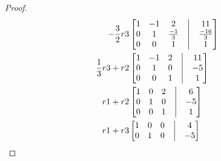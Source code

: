 \documentclass[12pt]{article}
\begin{document}
\begin{enumerate}
\begin{enumerate}
\begin{proof}
                                    \begin{align*}
                                            -\frac{3}{2}r3
                                             &
                                            \begin{bmatrix}
                                                    1 & -1 & 2            & \bigm| & 11            \\
                                                    0 & 1  & \frac{-1}{3} & \bigm| & \frac{-16}{3} \\
                                                    0 & 0  & 1            & \bigm| & 1             \\
                                            \end{bmatrix} \\
                                            \frac{1}{3}r3+r2
                                             &
                                            \begin{bmatrix}
                                                    1 & -1 & 2 & \bigm| & 11 \\
                                                    0 & 1  & 0 & \bigm| & -5 \\
                                                    0 & 0  & 1 & \bigm| & 1  \\
                                            \end{bmatrix} \\
                                            r1 + r2
                                             &
                                            \begin{bmatrix}
                                                    1 & 0 & 2 & \bigm| & 6  \\
                                                    0 & 1 & 0 & \bigm| & -5 \\
                                                    0 & 0 & 1 & \bigm| & 1  \\
                                            \end{bmatrix} \\
                                            r1 + r3
                                             &
                                            \begin{bmatrix}
                                                    1 & 0 & 0 & \bigm| & 4  \\
                                                    0 & 1 & 0 & \bigm| & -5 \\

\end{bmatrix}
\end{align*}
\end{proof}
\end{enumerate}
\end{enumerate}
\end{document}
